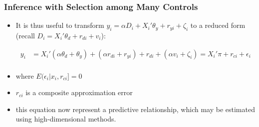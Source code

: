 \documentclass[
  shownotes,
  xcolor={svgnames},
  hyperref={colorlinks,citecolor=DarkBlue,linkcolor=DarkRed,urlcolor=DarkBlue}
  , aspectratio=169]{beamer}
\begin{document}
\begin{frame}[fragile]
\frametitle{Inference with Selection among Many Controls}
\begin{itemize}

\item It is thus useful to transform $y_i = \alpha D_i + X_i'\theta_y +r_{yi} + \zeta_i$  to a reduced form (recall $D_i = X_i'\theta_d + r_{di}+v_i$):

\begin{align}
y_i &= X_i'(\alpha \theta_d +  \theta_y) + (\alpha r_{di} + r_{yi}) + r_{di}+ (\alpha v_i +\zeta_i) = X_i' \pi + r_{ci} + \epsilon_i \\ \nonumber
\end{align}
\item where $E(\epsilon_i | x_i,r_{ci}]=0$ 
\item $r_{ci}$ is a composite approximation error
\item this equation now represent a predictive relationship, which may be estimated using high-dimensional methods. 


\end{itemize}

\end{frame}
\end{document}
